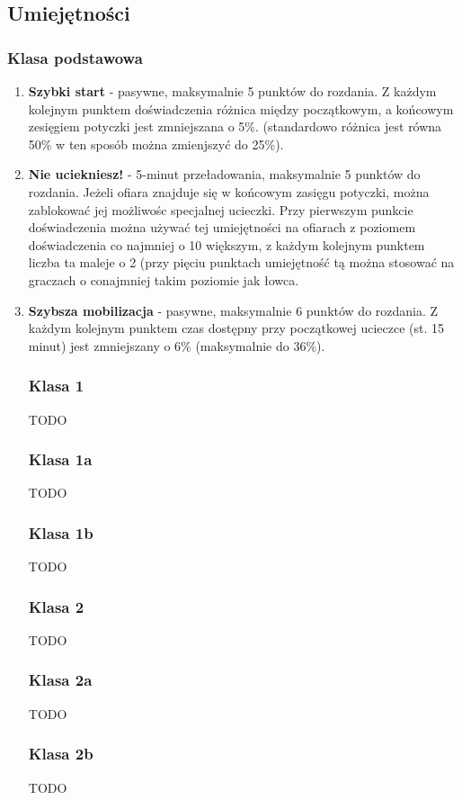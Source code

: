 \documentclass[a4paper,11pt,notitlepage]{article}
\begin{document}
\subsection{Umiejętności}
\subsubsection{Klasa podstawowa}
\begin{enumerate}
\item \textbf{Szybki start} - pasywne, maksymalnie 5 punktów do rozdania. Z każdym kolejnym punktem doświadczenia różnica między początkowym, a końcowym zesięgiem potyczki jest zmniejszana o 5\%. (standardowo różnica jest równa 50\% w ten sposób można zmienjszyć do 25\%).

\item \textbf{Nie uciekniesz!} - 5-minut przeładowania, maksymalnie 5 punktów do rozdania. Jeżeli ofiara znajduje się w końcowym zasięgu potyczki, można zablokować jej możliwośc specjalnej ucieczki. Przy pierwszym punkcie doświadczenia można używać tej umiejętności na ofiarach z poziomem doświadczenia co najmniej o 10 większym, z każdym kolejnym punktem liczba ta maleje o 2 (przy pięciu punktach umiejętność tą można stosować na graczach o conajmniej takim poziomie jak łowca.

\item \textbf{Szybsza mobilizacja} - pasywne, maksymalnie 6 punktów do rozdania. Z każdym kolejnym punktem czas dostępny przy początkowej ucieczce (st. 15 minut) jest zmniejszany o 6\% (maksymalnie do 36\%).

\subsubsection{Klasa 1}
TODO
\subsubsection{Klasa 1a}
TODO
\subsubsection{Klasa 1b}
TODO

\subsubsection{Klasa 2}
TODO
\subsubsection{Klasa 2a}
TODO
\subsubsection{Klasa 2b}
TODO


\end{enumerate}
\end{document}
